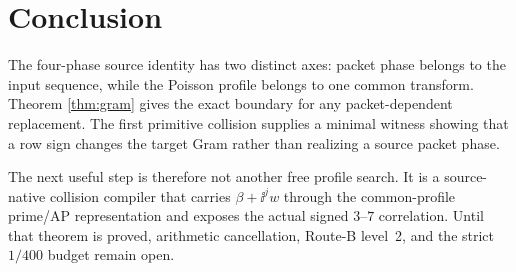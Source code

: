 \section{Conclusion}

The four-phase source identity has two distinct axes: packet phase belongs to the input
sequence, while the Poisson profile belongs to one common transform.  Theorem
\ref{thm:gram} gives the exact boundary for any packet-dependent replacement.  The
first primitive collision supplies a minimal witness showing that a row sign changes
the target Gram rather than realizing a source packet phase.

The next useful step is therefore not another free profile search.  It is a
source-native collision compiler that carries $\beta+\ii^jw$ through the common-profile
prime/AP representation and exposes the actual signed $3$--$7$ correlation.  Until
that theorem is proved, arithmetic cancellation, Route-B level~2, and the strict
$1/400$ budget remain open.

